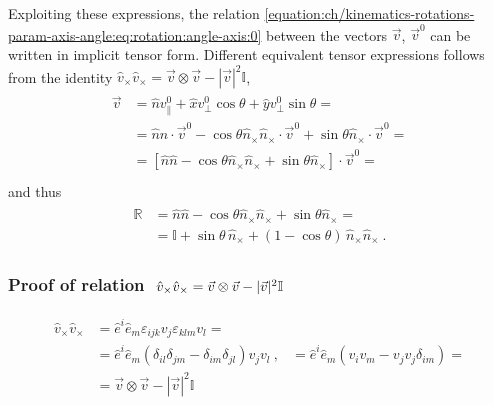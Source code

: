 \documentclass[letterpaper,10pt,english]{jupyterBook}
\begin{document}
\sphinxAtStartPar
Exploiting these expressions, the relation \eqref{equation:ch/kinematics-rotations-param-axis-angle:eq:rotation:angle-axis:0} between the vectors \(\vec{v}\), \(\vec{v}^0\) can be written in implicit tensor form. Different equivalent tensor expressions follows from the identity \(\hat{v}_\times \hat{v}_\times =  \vec{v} \otimes \vec{v} - |\vec{v}|^2 \mathbb{I} \),
\begin{equation*}
\begin{split}\begin{aligned}
  \vec{v}
  & = \hat{n} v^0_{\parallel} + \hat{x} v^0_{\perp} \cos \theta + \hat{y} v^0_{\perp} \sin \theta = \\
  & = \hat{n} \hat{n} \cdot \vec{v}^0 - \cos \theta \hat{n}_\times \hat{n}_\times \cdot \vec{v}^0 + \sin \theta \hat{n}_\times \cdot \vec{v}^0 = \\
  & = \left[ \hat{n} \hat{n} - \cos \theta \hat{n}_\times \hat{n}_\times + \sin \theta \hat{n}_\times \right] \cdot \vec{v}^0 = \\
\end{aligned}\end{split}
\end{equation*}
\sphinxAtStartPar
and thus
\begin{equation*}
\begin{split}\begin{aligned}
 \mathbb{R}
 & = \hat{n} \hat{n} - \cos \theta \hat{n}_\times \hat{n}_\times + \sin \theta \hat{n}_\times = \\
 & = \mathbb{I}  + \sin \theta \, \hat{n}_\times + (1 - \cos \theta ) \, \hat{n}_\times \hat{n}_\times \ .
\end{aligned}\end{split}
\end{equation*}\subsubsection*{Proof of relation \protect\(\ \hat{v}_\times \hat{v}_{\times} = \vec{v} \otimes \vec{v} - |\vec{v}|^2 \mathbb{I} \protect\)}
\begin{equation*}
\begin{split}\begin{aligned}
  \hat{v}_\times \hat{v}_{\times}
  & = \hat{e}^i \hat{e}_m \varepsilon_{ijk} v_j \varepsilon_{klm} v_l = \\
  & = \hat{e}^i \hat{e}_m \left( \delta_{il} \delta_{jm} - \delta_{im} \delta_{jl} \right) v_j v_l  \ ,
  & = \hat{e}^i \hat{e}_m \left( v_i v_m - v_j v_j \delta_{im} \right) = \\
  & = \vec{v} \otimes \vec{v} - |\vec{v}|^2 \mathbb{I}
\end{aligned}\end{split}
\end{equation*}
\end{document}

